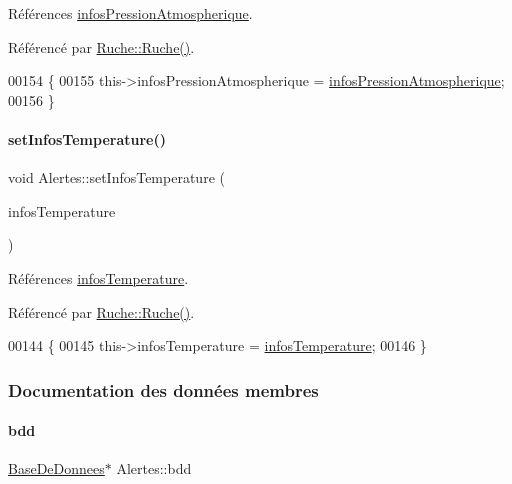 Références \hyperlink{class_alertes_af4bfb245d72bc2eb080df844aa50ac86}{infos\+Pression\+Atmospherique}.



Référencé par \hyperlink{class_ruche_a8b4ee3752d984c5acee93b990db7939a}{Ruche\+::\+Ruche()}.


\begin{DoxyCode}
00154 \{
00155     this->infosPressionAtmospherique = \hyperlink{class_alertes_af4bfb245d72bc2eb080df844aa50ac86}{infosPressionAtmospherique};
00156 \}
\end{DoxyCode}
\mbox{\label{class_alertes_a091a0fabca5b06302bc19de31aecafff}} 
\paragraph{\texorpdfstring{set\+Infos\+Temperature()}{setInfosTemperature()}}
{\footnotesize\ttfamily void Alertes\+::set\+Infos\+Temperature (\begin{DoxyParamCaption}\item[{\hyperlink{class_infos_temperature}{Infos\+Temperature} $\ast$}]{infos\+Temperature }\end{DoxyParamCaption})}



Références \hyperlink{class_alertes_ad02b203545812ad6408befecc94ee0ec}{infos\+Temperature}.



Référencé par \hyperlink{class_ruche_a8b4ee3752d984c5acee93b990db7939a}{Ruche\+::\+Ruche()}.


\begin{DoxyCode}
00144 \{
00145     this->infosTemperature = \hyperlink{class_alertes_ad02b203545812ad6408befecc94ee0ec}{infosTemperature};
00146 \}
\end{DoxyCode}


\subsubsection{Documentation des données membres}
\mbox{\label{class_alertes_a91e58b69d29922e8e984efb767ae5268}} 
\paragraph{\texorpdfstring{bdd}{bdd}}
{\footnotesize\ttfamily \hyperlink{class_base_de_donnees}{Base\+De\+Donnees}$\ast$ Alertes\+::bdd\hspace{0.3cm}{\ttfamily [private]}}



